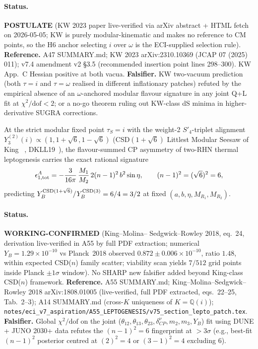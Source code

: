 \paragraph{Status.}  \textbf{POSTULATE} (KW 2023 paper live-verified
via arXiv abstract + HTML fetch on 2026-05-05; KW is purely
modular-kinematic and makes no reference to CM points, so the H6
anchor selecting $i$ over $\omega$ is the ECI-supplied selection rule).
\textbf{Reference.}  A47 SUMMARY.md; KW 2023 arXiv:2310.10369
(JCAP 07 (2025) 011); v7.4 amendment v2 \S 3.5 (recommended insertion
point lines 298--300).  KW App.~C Hessian positive at both vacua.
\textbf{Falsifier.}  KW two-vacuum prediction (both $\tau = i$ and
$\tau = \omega$ realised in different inflationary patches) refuted by
the empirical absence of an $\omega$-anchored modular flavour signature
in any joint Q+L fit at $\chi^2/\mathrm{dof} < 2$; or a no-go theorem
ruling out KW-class dS minima in higher-derivative SUGRA corrections.

\begin{axiom*}[$H_{10}'$, leptogenesis $(n-1)^2 = 6$ fingerprint (NEW v7.5)]
At the strict modular fixed point $\tau_S = i$ with the weight-2
$S'_4$-triplet alignment $Y_3^{(2)}(i) \propto (1, 1+\sqrt{6},
1-\sqrt{6})$ (CSD$(1+\sqrt{6})$ Littlest Modular Seesaw of King~%
\cite{LMS22}, DKLL19~\cite{DKLL19}), the flavour-summed
CP asymmetry of two-RHN thermal leptogenesis carries the exact
rational signature
\[
  \epsilon^A_{1,{\rm tot}} = -\frac{3}{16\pi}\,\frac{M_1}{M_2}\,2(n-1)^2
  \,b^2\sin\eta,\qquad (n-1)^2 = (\sqrt{6})^2 = 6,
\]
predicting $Y_B^{\rm CSD(1+\sqrt{6})}/Y_B^{\rm CSD(3)} = 6/4 = 3/2$ at
fixed $(a, b, \eta, M_{R_1}, M_{R_2})$.
\end{axiom*}

\paragraph{Status.}  \textbf{WORKING-CONFIRMED} (King--Molina--%
Sedgwick--Rowley 2018, eq.~24, derivation live-verified in A55 by full
PDF extraction; numerical $Y_B = 1.29 \times 10^{-10}$ vs Planck~2018
observed $0.872 \pm 0.006 \times 10^{-10}$, ratio $1.48$, within
expected CSD($n$) family scatter; viability scan yields $7/512$ grid
points inside Planck $\pm 1\sigma$ window).  No SHARP new falsifier
added beyond King-class CSD($n$) framework.
\textbf{Reference.}  A55 SUMMARY.md; King--Molina--Sedgwick--Rowley
2018 arXiv:1808.01005 (live-verified, full PDF extracted, eqs.~22--25,
Tab.~2--3); A14 SUMMARY.md (cross-$K$ uniqueness of $K = \mathbb{Q}(i)$);
\texttt{notes/eci\_v7\_aspiration/A55\_LEPTOGENESIS/v75\_section\_lepto\_patch.tex}.
\textbf{Falsifier.}  Global $\chi^2/\mathrm{dof}$ on the joint
($\theta_{12}, \theta_{13}, \theta_{23}, \delta_{CP}^\nu, m_2, m_3,
Y_B$) fit using DUNE + JUNO 2030+ data refutes the $(n-1)^2 = 6$
fingerprint at $> 3\sigma$ (e.g., best-fit $(n-1)^2$ posterior centred
at $(2)^2 = 4$ or $(3-1)^2 = 4$ excluding $6$).

